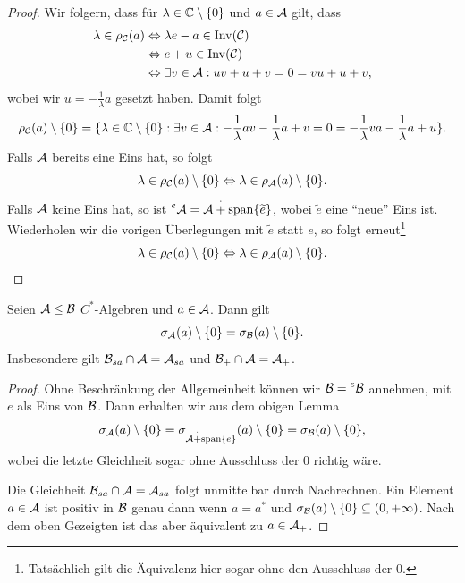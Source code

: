 \begin{proof}
    Wir folgern, dass für $\lambda \in \mathbb{C} \setminus \{0\}$ und $a \in \mathcal{A}$ gilt, dass
    \begin{align*}
        \lambda \in \rho_{\mathcal{C}} (a)
        &\Leftrightarrow
        \lambda e - a \in \operatorname*{Inv}(\mathcal{C})
        \\ &\Leftrightarrow
        e + u \in \operatorname*{Inv}(\mathcal{C})
        \\ &\Leftrightarrow
        \exists v \in \mathcal{A} : uv + u + v = 0 = vu + u + v,
    \end{align*}
    wobei wir $u = -\frac{1}{\lambda} a$ gesetzt haben. Damit folgt
    \begin{align*}
        \rho_{\mathcal{C}} (a) \setminus \{0\} = \{ \lambda \in \mathbb{C} \setminus \{ 0 \} : \exists v \in \mathcal{A} : -\frac{1}{\lambda} a v - \frac{1}{\lambda} a + v = 0 = -\frac{1}{\lambda} v a - \frac{1}{\lambda} a + u \}.
    \end{align*}
    Falls $\mathcal{A}$ bereits eine Eins hat, so folgt
    \[
        \lambda \in \rho_{\mathcal{C}} (a) \setminus \{0\}
        \Leftrightarrow
        \lambda \in \rho_{\mathcal{A}} (a) \setminus \{0\}.
    \]
    Falls $\mathcal{A}$ keine Eins hat, so ist $\prescript{e}{}{\mathcal{A}} = \mathcal{A} \overset{\cdot}{+} \mathrm{span} \{ \widetilde{e} \}$, wobei $\widetilde{e}$ eine ``neue'' Eins ist. Wiederholen wir die vorigen Überlegungen mit $\widetilde{e}$ statt $e$, so folgt erneut\footnote{Tatsächlich gilt die Äquivalenz hier sogar ohne den Ausschluss der $0$.}
    \[
        \lambda \in \rho_{\mathcal{C}} (a) \setminus \{0\}
        \Leftrightarrow
        \lambda \in \rho_{\mathcal{A}} (a) \setminus \{0\}. \qedhere
    \]
\end{proof}

\begin{corollary}
    Seien $\mathcal{A} \leq \mathcal{B}$ $C^*$-Algebren und $a \in \mathcal{A}$. Dann gilt
    $$ \sigma_{\mathcal{A}} (a) \setminus \{0\} = \sigma_{\mathcal{B}} (a) \setminus \{0\}. $$
    Insbesondere gilt $\mathcal{B}_{sa} \cap \mathcal{A} = \mathcal{A}_{sa}$ und $\mathcal{B}_+ \cap \mathcal{A} = \mathcal{A}_+$.
\end{corollary}

\begin{proof}
    Ohne Beschränkung der Allgemeinheit können wir $\mathcal{B} = \prescript{e}{}{\mathcal{B}}$ annehmen, mit $e$ als Eins von $\mathcal{B}$. Dann erhalten wir aus dem obigen Lemma
    $$ \sigma_{\mathcal{A}} (a) \setminus \{0\} = \sigma_{\mathcal{A} \overset{\cdot}{+} \mathrm{span} \{ e \}} (a) \setminus \{ 0 \} = \sigma_{\mathcal{B}} (a) \setminus \{ 0 \}, $$
    wobei die letzte Gleichheit sogar ohne Ausschluss der $0$ richtig wäre.

    Die Gleichheit $\mathcal{B}_{sa} \cap \mathcal{A} = \mathcal{A}_{sa}$ folgt unmittelbar durch Nachrechnen. Ein Element $a \in \mathcal{A}$ ist positiv in $\mathcal{B}$ genau dann wenn $a = a^*$ und $\sigma_{\mathcal{B}} (a) \setminus \{ 0 \} \subseteq (0, +\infty)$. Nach dem oben Gezeigten ist das aber äquivalent zu $a \in \mathcal{A}_+$.
\end{proof}

